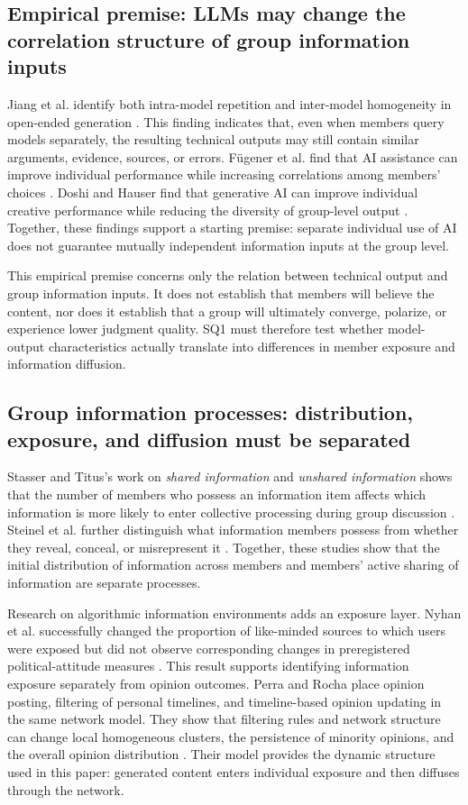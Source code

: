 \documentclass[11pt,a4paper]{article}
\newcommand{\term}[1]{\textit{#1}}
\begin{document}
\subsection{Empirical premise: LLMs may change the correlation structure of group information inputs}

Jiang et al. identify both intra-model repetition and inter-model homogeneity in open-ended generation \cite{jiang2025}. This finding indicates that, even when members query models separately, the resulting technical outputs may still contain similar arguments, evidence, sources, or errors. F\"ugener et al. find that AI assistance can improve individual performance while increasing correlations among members' choices \cite{fugener2021}. Doshi and Hauser find that generative AI can improve individual creative performance while reducing the diversity of group-level output \cite{doshi2024}. Together, these findings support a starting premise: separate individual use of AI does not guarantee mutually independent information inputs at the group level.

This empirical premise concerns only the relation between technical output and group information inputs. It does not establish that members will believe the content, nor does it establish that a group will ultimately converge, polarize, or experience lower judgment quality. SQ1 must therefore test whether model-output characteristics actually translate into differences in member exposure and information diffusion.

\subsection{Group information processes: distribution, exposure, and diffusion must be separated}

Stasser and Titus's work on \term{shared information} and \term{unshared information} shows that the number of members who possess an information item affects which information is more likely to enter collective processing during group discussion \cite{stasser1985}. Steinel et al. further distinguish what information members possess from whether they reveal, conceal, or misrepresent it \cite{steinel2010}. Together, these studies show that the initial distribution of information across members and members' active sharing of information are separate processes.

Research on algorithmic information environments adds an exposure layer. Nyhan et al. successfully changed the proportion of like-minded sources to which users were exposed but did not observe corresponding changes in preregistered political-attitude measures \cite{nyhan2023}. This result supports identifying information exposure separately from opinion outcomes. Perra and Rocha place opinion posting, filtering of personal timelines, and timeline-based opinion updating in the same network model. They show that filtering rules and network structure can change local homogeneous clusters, the persistence of minority opinions, and the overall opinion distribution \cite{perra2019}. Their model provides the dynamic structure used in this paper: generated content enters individual exposure and then diffuses through the network.
\end{document}
